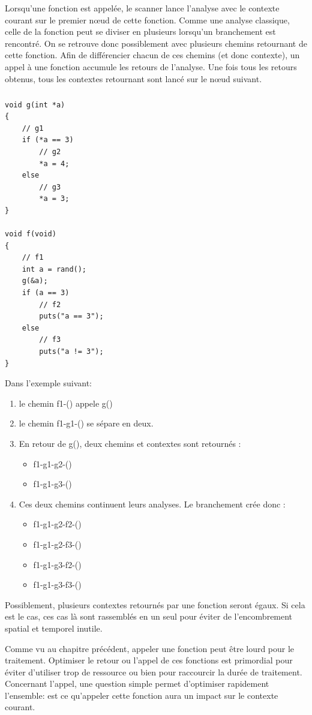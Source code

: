 Lorsqu'une fonction est appelée, le scanner lance l'analyse avec le contexte courant sur le premier nœud de cette fonction. Comme une analyse classique, celle de la fonction peut se diviser
en plusieurs lorsqu'un branchement est rencontré. On se retrouve donc possiblement avec plusieurs chemins retournant de cette fonction. Afin de différencier chacun de ces chemins (et donc contexte),
un appel à une fonction accumule les retours de l'analyse. Une fois tous les retours obtenus, tous les contextes retournant sont lancé sur le nœud suivant.
\subparagraph{}
\begin {lstlisting}[frame=single]
void g(int *a)
{
    // g1
    if (*a == 3)
        // g2
        *a = 4;
    else
        // g3
        *a = 3;
}

void f(void)
{
    // f1
    int a = rand();
    g(&a);
    if (a == 3)
        // f2
        puts("a == 3");
    else
        // f3
        puts("a != 3");
}
\end{lstlisting}
Dans l'exemple suivant:
\begin{enumerate}
    \item le chemin f1-() appele g()
    \item le chemin f1-g1-() se sépare en deux.
    \item En retour de g(), deux chemins et contextes sont retournés :
    \begin{itemize}
        \item f1-g1-g2-()
        \item f1-g1-g3-()
    \end{itemize}
    \item Ces deux chemins continuent leurs analyses. Le branchement crée donc :
            \begin{itemize}
                \item f1-g1-g2-f2-()
                \item f1-g1-g2-f3-()
                \item f1-g1-g3-f2-()
                \item f1-g1-g3-f3-()
            \end{itemize}
\end{enumerate}
Possiblement, plusieurs contextes retournés par une fonction seront égaux. Si cela est le cas,
ces cas là sont rassemblés en un seul pour éviter de l'encombrement spatial et temporel inutile.

Comme vu au chapitre précédent, appeler une fonction peut être lourd pour le traitement. Optimiser le retour
ou l'appel de ces fonctions est primordial pour éviter d'utiliser trop de ressource ou bien pour raccourcir la durée de traitement.
Concernant l'appel, une question simple permet d'optimiser rapidement l'ensemble: est ce qu'appeler cette fonction aura un impact sur le contexte courant.

